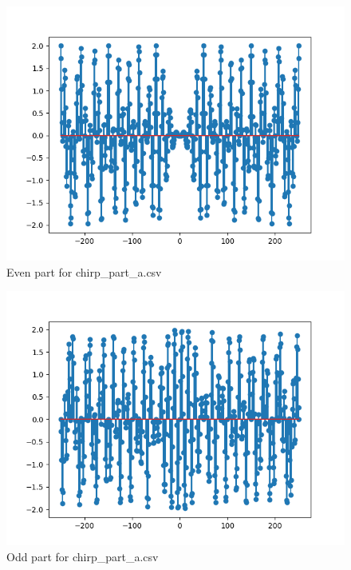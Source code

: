 \documentclass[10pt,a4paper, margin=1in]{article}
\begin{document}
\begin{enumerate}
\begin{enumerate}
                    \begin{figure}[H]
                        \centering
                        \includegraphics[scale=0.75]{chirp_part_a_even.png}
                        \caption{Even part for chirp\_part\_a.csv}
                    \end{figure}
                    \begin{figure}[H]
                        \centering
                        \includegraphics[scale=0.75]{chirp_part_a_odd.png}
                        \caption{Odd part for chirp\_part\_a.csv}
                    \end{figure}
                    \begin{figure}[H]
                        \centering

\end{figure}
\end{enumerate}
\end{enumerate}
\end{document}
